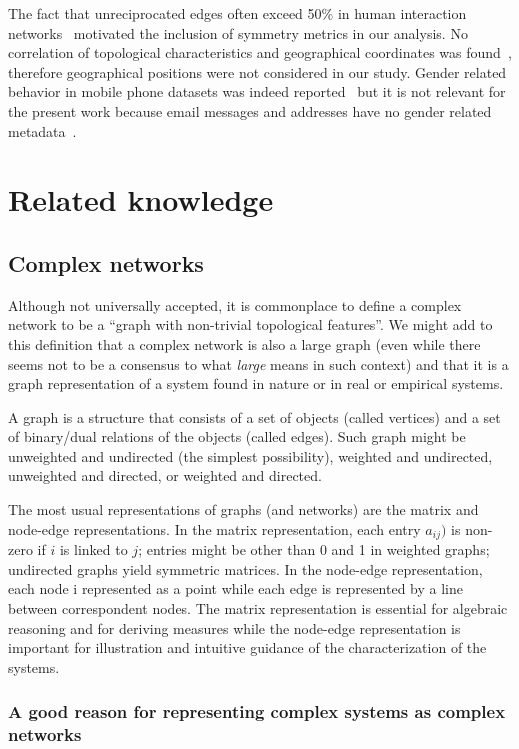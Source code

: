 The fact that unreciprocated edges often exceed 50\% in human interaction networks~\cite{newmanEvolving} motivated the inclusion of symmetry metrics in our analysis.
No correlation of topological characteristics and geographical coordinates was found~\cite{barabasiGeo},
therefore geographical positions were not considered in our study.
Gender related behavior in mobile phone datasets was indeed reported~\cite{barabasiSex}
but it is not relevant for the present work because email messages and addresses have no gender related metadata~\cite{gmanePack}.

\section{Related knowledge}
\subsection{Complex networks}
Although not universally accepted, it is commonplace to define a complex network to be
a ``graph with non-trivial topological features''.
We might add to this definition that a complex network is also a large graph (even while there
seems not to be a consensus to what \emph{large} means in such context)
and that it is a graph representation of a system found in nature or in real or empirical systems.

A graph is a structure that consists of a set of objects (called vertices)
and a set of binary/dual relations of the objects (called edges).
Such graph might be unweighted and undirected (the simplest possibility),
weighted and undirected, unweighted and directed, or weighted and directed.

The most usual representations of graphs (and networks) are the matrix and node-edge representations.
In the matrix representation, each entry $a_{ij})$ is non-zero if $i$ is linked to $j$;
entries might be other than 0 and 1 in weighted graphs; undirected graphs yield symmetric matrices.
In the node-edge representation, each node i represented as a point while each edge is represented
by a line between correspondent nodes.
The matrix representation is essential for algebraic reasoning and for deriving measures
while the node-edge representation is important for illustration and intuitive guidance
of the characterization of the systems.

\subsubsection{A good reason for representing complex systems as complex networks}

